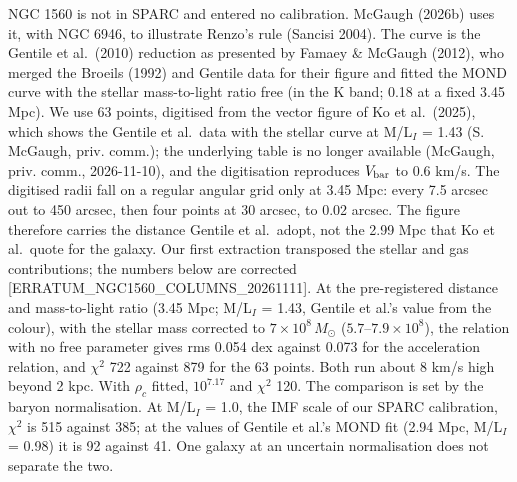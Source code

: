 \documentclass[
  10pt,
]{article}
\begin{document}
NGC 1560 is not in SPARC and entered no calibration. McGaugh (2026b) uses it, with NGC 6946, to illustrate Renzo's rule (Sancisi 2004). The curve is the Gentile et al.~(2010) reduction as presented by Famaey \& McGaugh (2012), who merged the Broeils (1992) and Gentile data for their figure and fitted the MOND curve with the stellar mass-to-light ratio free (in the K band; 0.18 at a fixed 3.45 Mpc). We use 63 points, digitised from the vector figure of Ko et al.~(2025), which shows the Gentile et al.\ data with the stellar curve at M/L$_I$ = 1.43 (S. McGaugh, priv. comm.); the underlying table is no longer available (McGaugh, priv. comm., 2026-11-10), and the digitisation reproduces $V_{\rm bar}$ to 0.6 km/s. The digitised radii fall on a regular angular grid only at 3.45 Mpc: every 7.5 arcsec out to 450 arcsec, then four points at 30 arcsec, to 0.02 arcsec. The figure therefore carries the distance Gentile et al.\ adopt, not the 2.99 Mpc that Ko et al.\ quote for the galaxy. Our first extraction transposed the stellar and gas contributions; the numbers below are corrected {[}ERRATUM\_NGC1560\_COLUMNS\_20261111{]}. At the pre-registered distance and mass-to-light ratio (3.45 Mpc; M/L$_I$ = 1.43, Gentile et al.'s value from the colour), with the stellar mass corrected to $7\times10^8\,M_\odot$ ($5.7$--$7.9\times10^8$), the relation with no free parameter gives rms 0.054 dex against 0.073 for the acceleration relation, and $\chi^2$ 722 against 879 for the 63 points. Both run about 8 km/s high beyond 2 kpc. With $\rho_c$ fitted, $10^{7.17}$ and $\chi^2$ 120. The comparison is set by the baryon normalisation. At M/L$_I$ = 1.0, the IMF scale of our SPARC calibration, $\chi^2$ is 515 against 385; at the values of Gentile et al.'s MOND fit (2.94 Mpc, M/L$_I$ = 0.98) it is 92 against 41. One galaxy at an uncertain normalisation does not separate the two.
\end{document}
